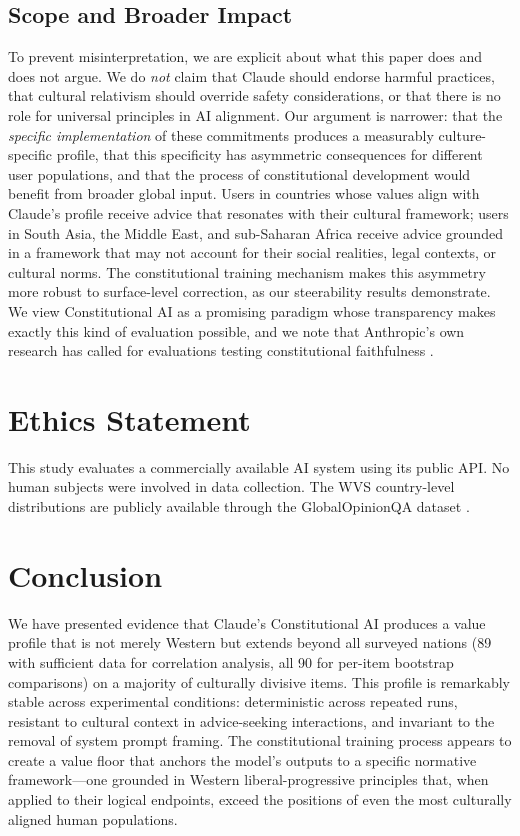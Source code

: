 \documentclass{article}
\begin{document}
\subsection{Scope and Broader Impact}

To prevent misinterpretation, we are explicit about what this paper does and does not argue. We do \textit{not} claim that Claude should endorse harmful practices, that cultural relativism should override safety considerations, or that there is no role for universal principles in AI alignment. Our argument is narrower: that the \textit{specific implementation} of these commitments produces a measurably culture-specific profile, that this specificity has asymmetric consequences for different user populations, and that the process of constitutional development would benefit from broader global input. Users in countries whose values align with Claude's profile receive advice that resonates with their cultural framework; users in South Asia, the Middle East, and sub-Saharan Africa receive advice grounded in a framework that may not account for their social realities, legal contexts, or cultural norms. The constitutional training mechanism makes this asymmetry more robust to surface-level correction, as our steerability results demonstrate. We view Constitutional AI as a promising paradigm whose transparency makes exactly this kind of evaluation possible, and we note that Anthropic's own research has called for evaluations testing constitutional faithfulness \citep{huang2024collective}.

\section*{Ethics Statement}

This study evaluates a commercially available AI system using its public API. No human subjects were involved in data collection. The WVS country-level distributions are publicly available through the GlobalOpinionQA dataset \citep{durmus2023measuring}.

\section{Conclusion}

We have presented evidence that Claude's Constitutional AI produces a value profile that is not merely Western but extends beyond all surveyed nations (89 with sufficient data for correlation analysis, all 90 for per-item bootstrap comparisons) on a majority of culturally divisive items. This profile is remarkably stable across experimental conditions: deterministic across repeated runs, resistant to cultural context in advice-seeking interactions, and invariant to the removal of system prompt framing. The constitutional training process appears to create a value floor that anchors the model's outputs to a specific normative framework---one grounded in Western liberal-progressive principles that, when applied to their logical endpoints, exceed the positions of even the most culturally aligned human populations.
\end{document}
